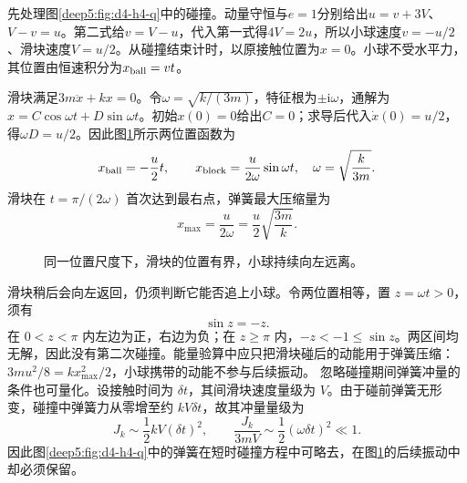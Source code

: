 \begin{solution}
先处理图\ref{deep5:fig:d4-h4-q}中的碰撞。动量守恒与$e=1$分别给出$u=v+3V$、$V-v=u$。第二式给$v=V-u$，代入第一式得$4V=2u$，所以小球速度$v=-u/2$、滑块速度$V=u/2$。从碰撞结束计时，以原接触位置为$x=0$。小球不受水平力，其位置由恒速积分为$x_{\rm ball}=vt$。

滑块满足$3m\ddot x+kx=0$。令$\omega=\sqrt{k/(3m)}$，特征根为$\pm\mathrm i\omega$，通解为$x=C\cos\omega t+D\sin\omega t$。初始$x(0)=0$给出$C=0$；求导后代入$\dot x(0)=u/2$，得$\omega D=u/2$。因此图\ref{deep5:fig:d4-h4-s}所示两位置函数为
\begin{equation}
 x_{\rm ball}=-\frac u2t,\qquad
 x_{\rm block}=\frac{u}{2\omega}\sin\omega t,
 \quad\omega=\sqrt{\frac{k}{3m}}.
\end{equation}
滑块在 $t=\pi/(2\omega)$ 首次达到最右点，弹簧最大压缩量为
\begin{equation}
 x_{\max}=\frac{u}{2\omega}=\frac u2\sqrt{\frac{3m}{k}}.
\end{equation}
\begin{figure}[H]\centering
{}
\caption{同一位置尺度下，滑块的位置有界，小球持续向左远离。}\label{deep5:fig:d4-h4-s}
\end{figure}
滑块稍后会向左返回，仍须判断它能否追上小球。令两位置相等，置 $z=\omega t>0$，须有
\begin{equation}
 \sin z=-z.
\end{equation}
在 $0<z<\pi$ 内左边为正，右边为负；在 $z\ge\pi$ 内，$-z<-1\le\sin z$。两区间均无解，因此没有第二次碰撞。能量验算中应只把滑块碰后的动能用于弹簧压缩：$3mu^2/8=kx_{\max}^2/2$，小球携带的动能不参与后续振动。
忽略碰撞期间弹簧冲量的条件也可量化。设接触时间为 $\delta t$，其间滑块速度量级为 $V$。由于碰前弹簧无形变，碰撞中弹簧力从零增至约 $kV\delta t$，故其冲量量级为
\[
J_k\sim\frac12kV(\delta t)^2,
\qquad \frac{J_k}{3mV}\sim\frac12(\omega\delta t)^2\ll1.
\]
因此图\ref{deep5:fig:d4-h4-q}中的弹簧在短时碰撞方程中可略去，在图\ref{deep5:fig:d4-h4-s}的后续振动中却必须保留。

\end{solution}


